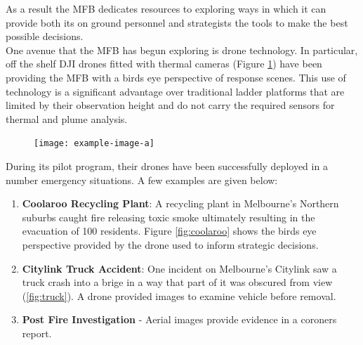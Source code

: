 \documentclass[capstone_report.tex]{subfiles}
\begin{document}
    As a result the MFB dedicates resources to exploring ways in which it can provide both its on ground personnel and strategists the tools to make the best possible decisions.\\

    One avenue that the MFB has begun exploring is drone technology.  In particular, off the shelf DJI drones \cite{DJI} fitted with thermal cameras (Figure \ref{fig:current_drone}) have been providing the MFB with a birds eye perspective of response scenes.  This use of technology is a significant advantage over traditional ladder platforms that are limited by their observation height and do not carry the required sensors for thermal and plume analysis.

    \begin{figure}  [H]
	\centering
        \texttt{[image: example-image-a]}
        \label{fig:current_drone}
    \end{figure}

    During its pilot program, their drones have been successfully deployed in a number emergency situations.  A few examples are given below:
    \begin{enumerate}
        \item \textbf{Coolaroo Recycling Plant}: A recycling plant in Melbourne's Northern suburbs caught fire releasing toxic smoke ultimately resulting in the evacuation of 100 residents.  Figure \ref{fig:coolaroo}  shows the birds eye perspective provided by the drone used to inform strategic decisions.
        \item \textbf{Citylink Truck Accident}: One incident on Melbourne's Citylink saw a truck crash into a brige in a way that part of it was obscured from view (\ref{fig:truck}).  A drone provided images to examine vehicle before removal.
        \item \textbf{Post Fire Investigation}  - Aerial images provide evidence in a coroners report.
    \end{enumerate}
\end{document}
